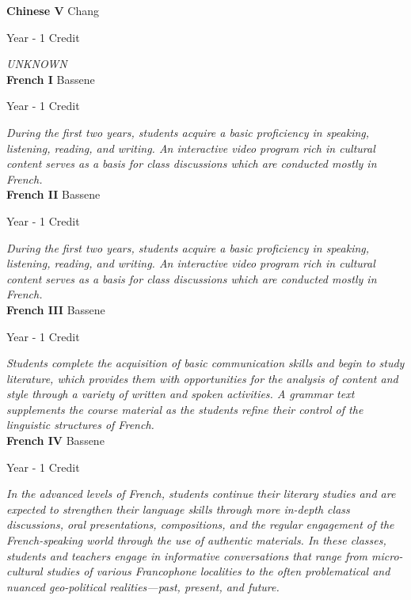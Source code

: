 \noindent\textbf{Chinese V} \hfill Chang

\noindent Year - 1 Credit

\vspace{1mm}\emph{UNKNOWN}\\


\noindent\textbf{French I} \hfill Bassene

\noindent Year - 1 Credit

\vspace{1mm}\emph{During the first two years, students acquire a basic proficiency in speaking, listening, reading, and writing.  An interactive video program rich in cultural content serves as a basis for class discussions which are conducted mostly in French.}\\


\noindent\textbf{French II} \hfill Bassene

\noindent Year - 1 Credit

\vspace{1mm}\emph{During the first two years, students acquire a basic proficiency in speaking, listening, reading, and writing.  An interactive video program rich in cultural content serves as a basis for class discussions which are conducted mostly in French.}\\


\noindent\textbf{French III} \hfill Bassene

\noindent Year - 1 Credit

\vspace{1mm}\emph{Students complete the acquisition of basic communication skills and begin to study literature, which provides them with opportunities for the analysis of content and style through a variety of written and spoken activities.  A grammar text supplements the course material as the students refine their control of the linguistic structures of French.}\\


\noindent\textbf{French IV} \hfill Bassene

\noindent Year - 1 Credit

\vspace{1mm}\emph{In the advanced levels of French, students continue their literary studies and are expected to strengthen their language skills through more in-depth class discussions, oral presentations, compositions, and the regular engagement of the French-speaking world through the use of authentic materials.  In these classes, students and teachers engage in informative conversations that range from micro-cultural studies of various Francophone localities to the often problematical and nuanced geo-political realities—past, present, and future.}\\


